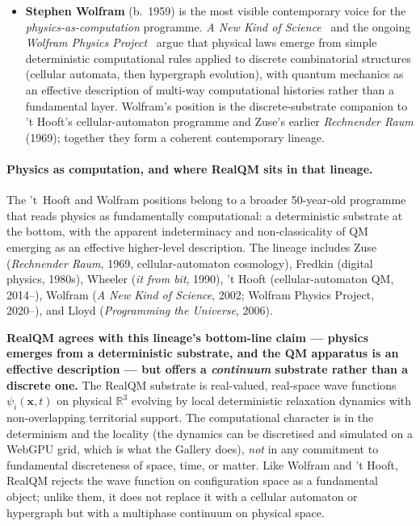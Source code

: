 \begin{itemize}
\item \textbf{Stephen Wolfram} (b.~1959) is the most visible contemporary voice for the \emph{physics-as-computation} programme. \emph{A New Kind of Science}~\cite{Wolfram2002} and the ongoing \emph{Wolfram Physics Project}~\cite{WolframPhysics2020} argue that physical laws emerge from simple deterministic computational rules applied to discrete combinatorial structures (cellular automata, then hypergraph evolution), with quantum mechanics as an effective description of multi-way computational histories rather than a fundamental layer. Wolfram's position is the discrete-substrate companion to 't Hooft's cellular-automaton programme and Zuse's earlier \emph{Rechnender Raum} (1969); together they form a coherent contemporary lineage.
\end{itemize}

\paragraph{Physics as computation, and where RealQM sits in that lineage.}
The 't~Hooft and Wolfram positions belong to a broader 50-year-old programme that reads physics as fundamentally computational: a deterministic substrate at the bottom, with the apparent indeterminacy and non-classicality of QM emerging as an effective higher-level description. The lineage includes Zuse (\emph{Rechnender Raum}, 1969, cellular-automaton cosmology), Fredkin (digital physics, 1980s), Wheeler (\emph{it from bit}, 1990), 't Hooft (cellular-automaton QM, 2014--), Wolfram (\emph{A New Kind of Science}, 2002; Wolfram Physics Project, 2020--), and Lloyd (\emph{Programming the Universe}, 2006).

\textbf{RealQM agrees with this lineage's bottom-line claim --- physics emerges from a deterministic substrate, and the QM apparatus is an effective description --- but offers a \emph{continuum} substrate rather than a discrete one.} The RealQM substrate is real-valued, real-space wave functions $\psi_i(\mathbf{x}, t)$ on physical $\mathbb{R}^3$ evolving by local deterministic relaxation dynamics with non-overlapping territorial support. The computational character is in the determinism and the locality (the dynamics can be discretised and simulated on a WebGPU grid, which is what the Gallery does), \emph{not} in any commitment to fundamental discreteness of space, time, or matter. Like Wolfram and 't Hooft, RealQM rejects the wave function on configuration space as a fundamental object; unlike them, it does not replace it with a cellular automaton or hypergraph but with a multiphase continuum on physical space.

